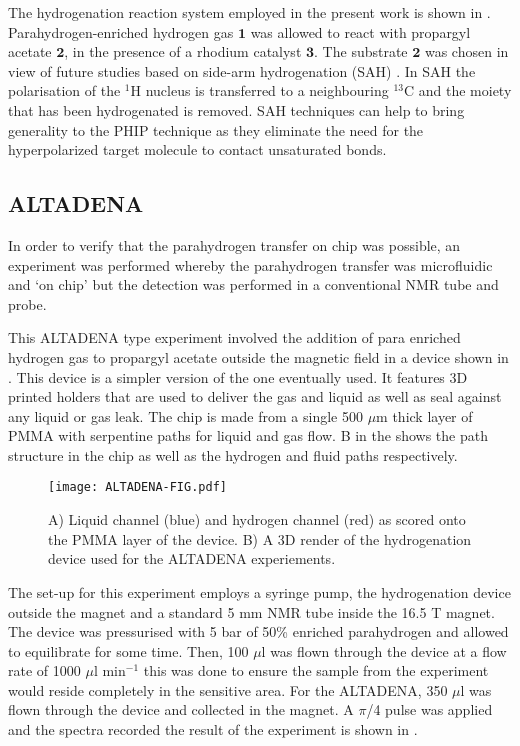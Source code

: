 The hydrogenation reaction system employed in the present work is shown in
.
Para\-hydrogen-en\-riched hydrogen gas $\mathbf{1}$ was
allowed to react with propargyl acetate $\mathbf{2}$, in the presence of
a rhodium catalyst $\mathbf{3}$. The substrate $\mathbf{2}$ was chosen in
view of future studies based on side-arm hydrogenation (SAH)
\cite{Reineri:2015he,cavallari201813,cavallari2015effects}. In SAH the
polarisation of the $^1$H nucleus is transferred to a neighbouring $^13$C
and the moiety that has been hydrogenated is removed. SAH techniques can
help to bring generality to the PHIP technique as they eliminate the need for
the hyperpolarized target molecule to contact unsaturated bonds.

\subsection{ALTADENA}

In order to verify that the parahydrogen transfer on chip was possible, an
experiment was performed whereby the parahydrogen transfer was microfluidic
and ‘on chip’ but the detection was performed in a conventional NMR tube and probe.

This ALTADENA type experiment involved the addition of para enriched hydrogen
gas to propargyl acetate outside the magnetic field in a device shown in . This device
is a simpler version of the one eventually used.
It features 3D printed holders that are used to deliver the gas and liquid as
well as seal against any liquid or gas leak. The chip is made from a single 500
$\mu$m thick layer of PMMA with serpentine paths for liquid and gas flow. B in the
 shows the path structure in the chip as well as the hydrogen and fluid paths
respectively.

\begin{figure}
  \begin{center}
  \texttt{[image: ALTADENA-FIG.pdf]}
  \end{center}
  \caption{A) Liquid channel (blue) and hydrogen channel (red) as scored
  onto the PMMA layer of the device. B) A 3D render of the hydrogenation device
  used for the ALTADENA experiements.}
  \label{fig:AltadenaChip}
\end{figure}

The set-up for this experiment employs a syringe pump, the hydrogenation device
outside the magnet and a standard 5 mm NMR tube inside the 16.5 T magnet. The device
was pressurised with 5 bar of 50\% enriched parahydrogen and allowed to equilibrate
for some time. Then, 100 $\mu$l was flown through the device at a flow rate of 1000
$\mu$l min$^{-1}$ this was done to ensure the sample from the experiment would reside
completely in the sensitive area. For the ALTADENA, 350 $\mu$l was flown through
the device and collected in the magnet. A $\pi$/4 pulse was applied and the spectra
recorded the result of the experiment is shown in .

